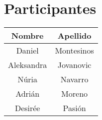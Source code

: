 \section{Participantes}

\begin{center}
\begin{tabular}{|c|c|}
\hline
{\cellcolor[gray]{.8} \bf Nombre} & {\cellcolor[gray]{.8} \bf Apellido}  \\
\hline
Daniel & Montesinos \\
\hline

Aleksandra & Jovanovic \\
\hline

Núria & Navarro \\
\hline

Adrián & Moreno \\
\hline

Desirée & Pasión \\
\hline
\end{tabular}
\end{center}
